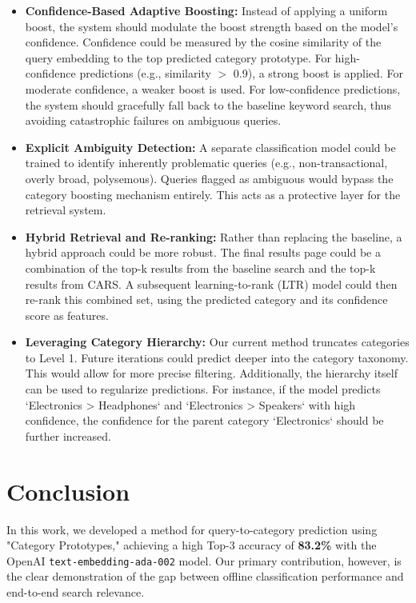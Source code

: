 \documentclass[12pt, a4paper]{article}
\begin{document}
\begin{itemize}
\item \textbf{Confidence-Based Adaptive Boosting:} Instead of applying a uniform boost, the system should modulate the boost strength based on the model's confidence. Confidence could be measured by the cosine similarity of the query embedding to the top predicted category prototype. For high-confidence predictions (e.g., similarity $>$ 0.9), a strong boost is applied. For moderate confidence, a weaker boost is used. For low-confidence predictions, the system should gracefully fall back to the baseline keyword search, thus avoiding catastrophic failures on ambiguous queries.

\item \textbf{Explicit Ambiguity Detection:} A separate classification model could be trained to identify inherently problematic queries (e.g., non-transactional, overly broad, polysemous). Queries flagged as ambiguous would bypass the category boosting mechanism entirely. This acts as a protective layer for the retrieval system.

\item \textbf{Hybrid Retrieval and Re-ranking:} Rather than replacing the baseline, a hybrid approach could be more robust. The final results page could be a combination of the top-k results from the baseline search and the top-k results from CARS. A subsequent learning-to-rank (LTR) model could then re-rank this combined set, using the predicted category and its confidence score as features.

\item \textbf{Leveraging Category Hierarchy:} Our current method truncates categories to Level 1. Future iterations could predict deeper into the category taxonomy. This would allow for more precise filtering. Additionally, the hierarchy itself can be used to regularize predictions. For instance, if the model predicts `Electronics \textgreater{} Headphones` and `Electronics \textgreater{} Speakers` with high confidence, the confidence for the parent category `Electronics` should be further increased.
\end{itemize}

\section{Conclusion}

In this work, we developed a method for query-to-category prediction using "Category Prototypes," achieving a high Top-3 accuracy of \textbf{83.2\%} with the OpenAI \texttt{text-embedding-ada-002} model. Our primary contribution, however, is the clear demonstration of the gap between offline classification performance and end-to-end search relevance.
\end{document}

